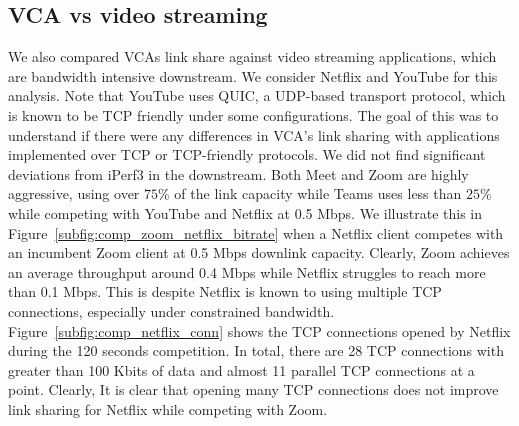 \subsection{VCA vs video streaming}
We also compared VCAs link share against video streaming applications, which are bandwidth intensive downstream. We consider Netflix and YouTube for this analysis. Note that YouTube uses QUIC, a UDP-based transport protocol, which is known to be TCP friendly under some configurations. The goal of this was to understand if there were any differences in VCA's link sharing with applications implemented over TCP or TCP-friendly protocols. We did not find significant deviations from iPerf3 in the downstream. Both Meet and Zoom are highly aggressive, using over $75\%$ of the link capacity while Teams uses less than $25\%$ while competing with YouTube and Netflix at 0.5 Mbps.
We illustrate this in Figure~\ref{subfig:comp_zoom_netflix_bitrate} when a Netflix client competes with an incumbent Zoom client at 0.5 Mbps downlink capacity. Clearly, Zoom achieves an average throughput around 0.4 Mbps while Netflix struggles to reach more than 0.1 Mbps. This is despite Netflix is known to using multiple TCP connections, especially under constrained bandwidth. Figure~\ref{subfig:comp_netflix_conn} shows the TCP connections opened by Netflix during the 120 seconds competition. In total, there are 28 TCP connections with greater than 100 Kbits of data and almost 11 parallel TCP connections at a point. Clearly, It is clear that opening many TCP connections does not improve link sharing for Netflix while competing with Zoom. 




